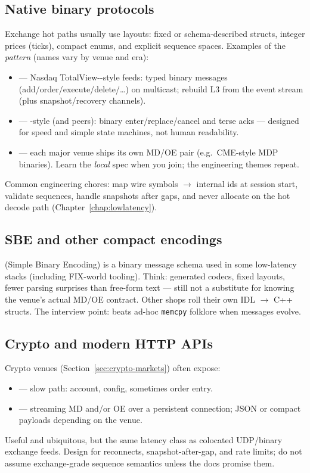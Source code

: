 \subsection{Native binary protocols}
\label{subsec:native-binary-protocols}
Exchange hot paths usually use  layouts: fixed 
or schema-described structs, integer prices (ticks), compact enums, and explicit 
sequence spaces. Examples of the \emph{pattern} (names vary by venue and era):
\begin{itemize}
    \item {} --- Nasdaq TotalView--style feeds: 
          typed binary messages (add/order/execute/delete/\ldots) on multicast; 
          rebuild L3 from the event stream (plus snapshot/recovery channels).
    \item {} --- -style (and peers): binary 
          enter/replace/cancel and terse acks --- designed for speed and simple 
          state machines, not human readability.
    \item {} --- each major venue ships its own MD/OE 
          pair (e.g.\ CME-style MDP binaries). Learn the \emph{local} spec when you 
          join; the engineering themes repeat.
\end{itemize}
Common engineering chores: map wire symbols $\rightarrow$ internal ids at session 
start, validate sequences, handle snapshots after gaps, and never allocate on the 
hot decode path (Chapter~\ref{chap:lowlatency}).

\subsection{SBE and other compact encodings}
\label{subsec:sbe-and-friends}
 (Simple Binary Encoding) is a binary message schema used in some 
low-latency stacks (including FIX-world tooling). Think: generated codecs, fixed 
layouts, fewer parsing surprises than free-form text --- still not a substitute for 
knowing the venue's actual MD/OE contract. Other shops roll their own IDL $\rightarrow$ 
C++ structs. The interview point:  beats ad-hoc 
\texttt{memcpy} folklore when messages evolve.

\subsection{Crypto and modern HTTP APIs}
\label{subsec:crypto-wire-apis}
Crypto venues (Section~\ref{sec:crypto-markets}) often expose:
\begin{itemize}
    \item {} --- slow path: account, config, sometimes order entry.
    \item {} --- streaming MD and/or OE over a persistent 
          connection; JSON or compact payloads depending on the venue.
\end{itemize}
Useful and ubiquitous, but  the same latency class as colocated 
UDP/binary exchange feeds. Design for reconnects, snapshot-after-gap, and 
rate limits; do not assume exchange-grade sequence semantics unless the docs 
promise them.

